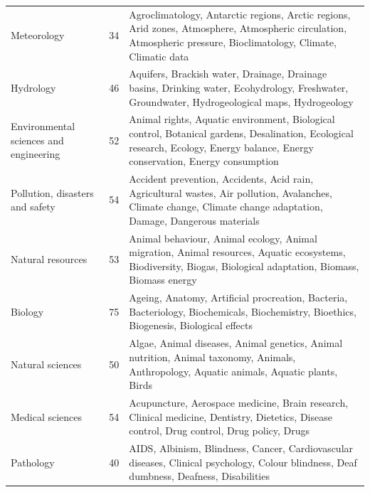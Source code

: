 \documentclass[pdflatex,sn-mathphys-num,iicol]{sn-jnl}
\begin{document}
\begin{table}[t]
\begin{tabular}{@{}p{3.5cm}p{2cm}p{8.5cm}@{}}
		Meteorology & 34 & Agroclimatology, Antarctic regions, Arctic regions, Arid zones, Atmosphere, Atmospheric circulation, Atmospheric pressure, Bioclimatology, Climate, Climatic data \\
		
		Hydrology & 46 & Aquifers, Brackish water, Drainage, Drainage basins, Drinking water, Ecohydrology, Freshwater, Groundwater, Hydrogeological maps, Hydrogeology \\
		
		Environmental sciences and engineering & 52 & Animal rights, Aquatic environment, Biological control, Botanical gardens, Desalination, Ecological research, Ecology, Energy balance, Energy conservation, Energy consumption \\
		
		Pollution, disasters and safety & 54 & Accident prevention, Accidents, Acid rain, Agricultural wastes, Air pollution, Avalanches, Climate change, Climate change adaptation, Damage, Dangerous materials \\
		
		Natural resources & 53 & Animal behaviour, Animal ecology, Animal migration, Animal resources, Aquatic ecosystems, Biodiversity, Biogas, Biological adaptation, Biomass, Biomass energy \\
		
		Biology & 75 & Ageing, Anatomy, Artificial procreation, Bacteria, Bacteriology, Biochemicals, Biochemistry, Bioethics, Biogenesis, Biological effects \\
		
		Natural sciences & 50 & Algae, Animal diseases, Animal genetics, Animal nutrition, Animal taxonomy, Animals, Anthropology, Aquatic animals, Aquatic plants, Birds \\
		
		Medical sciences & 54 & Acupuncture, Aerospace medicine, Brain research, Clinical medicine, Dentistry, Dietetics, Disease control, Drug control, Drug policy, Drugs \\
		
		Pathology & 40 & AIDS, Albinism, Blindness, Cancer, Cardiovascular diseases, Clinical psychology, Colour blindness, Deaf dumbness, Deafness, Disabilities \\
		
		\bottomrule
	\end{tabular}
\end{table}

\normalsize
\end{document}
